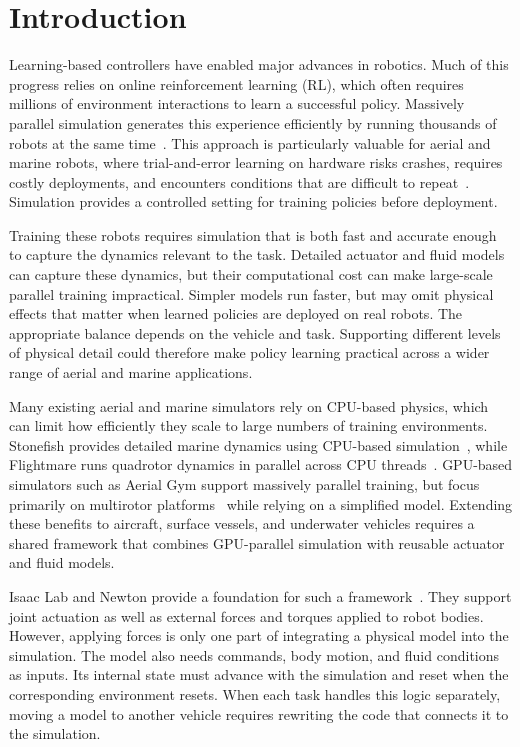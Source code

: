 \section{Introduction}
\label{sec:introduction}

Learning-based controllers have enabled major advances in robotics.
%
Much of this progress relies on online reinforcement learning (RL), which often requires millions of environment interactions to learn a successful policy.
%
Massively parallel simulation generates this experience efficiently by running thousands of robots at the same time~\cite{makoviychuk2021isaacgym,mittal2025isaaclab}.
%
This approach is particularly valuable for aerial and marine robots, where trial-and-error learning on hardware risks crashes, requires costly deployments, and encounters conditions that are difficult to repeat~\cite{grimaldi2025stonefish}.
%
Simulation provides a controlled setting for training policies before deployment.

Training these robots requires simulation that is both fast and accurate enough to capture the dynamics relevant to the task.
%
Detailed actuator and fluid models can capture these dynamics, but their computational cost can make large-scale parallel training impractical.
%
Simpler models run faster, but may omit physical effects that matter when learned policies are deployed on real robots.
%
The appropriate balance depends on the vehicle and task.
%
Supporting different levels of physical detail could therefore make policy learning practical across a wider range of aerial and marine applications.

Many existing aerial and marine simulators rely on CPU-based physics, which can limit how efficiently they scale to large numbers of training environments.
%
Stonefish provides detailed marine dynamics using CPU-based simulation~\cite{grimaldi2025stonefish}, while Flightmare runs quadrotor dynamics in parallel across CPU threads~\cite{song2021flightmare}.
%
GPU-based simulators such as Aerial Gym support massively parallel training, but focus primarily on multirotor platforms~\cite{kulkarni2025aerial} while relying on a simplified model.
%
Extending these benefits to aircraft, surface vessels, and underwater vehicles requires a shared framework that combines GPU-parallel simulation with reusable actuator and fluid models.

Isaac Lab and Newton provide a foundation for such a framework~\cite{mittal2025isaaclab,newton2025}.
%
They support joint actuation as well as external forces and torques applied to robot bodies.
%
However, applying forces is only one part of integrating a physical model into the simulation.
%
The model also needs commands, body motion, and fluid conditions as inputs.
%
Its internal state must advance with the simulation and reset when the corresponding environment resets.
%
When each task handles this logic separately, moving a model to another vehicle requires rewriting the code that connects it to the simulation.

